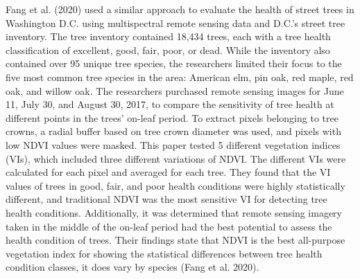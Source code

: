\documentclass[12pt,twoside]{reedthesis}
\begin{document}
Fang et al. (2020) used a similar approach to evaluate the health of street trees
in Washington D.C. using multispectral remote sensing data and D.C.'s
street tree inventory. The tree inventory contained 18,434 trees, each
with a tree health classification of excellent, good, fair, poor, or
dead. While the inventory also contained over 95 unique tree species,
the researchers limited their focus to the five most common tree species
in the area: American elm, pin oak, red maple, red oak, and willow oak.
The researchers purchased remote sensing images for June 11, July 30,
and August 30, 2017, to compare the sensitivity of tree health at
different points in the trees' on-leaf period. To extract pixels
belonging to tree crowns, a radial buffer based on tree crown diameter
was used, and pixels with low NDVI values were masked. This paper tested
5 different vegetation indices (VIs), which included three different
variations of NDVI. The different VIs were calculated for each pixel and
averaged for each tree. They found that the VI values of trees in good,
fair, and poor health conditions were highly statistically different,
and traditional NDVI was the most sensitive VI for detecting tree health
conditions. Additionally, it was determined that remote sensing imagery
taken in the middle of the on-leaf period had the best potential to
assess the health condition of trees. Their findings state that NDVI is
the best all-purpose vegetation index for showing the statistical
differences between tree health condition classes, it does vary by
species (Fang et al. 2020).
\end{document}
